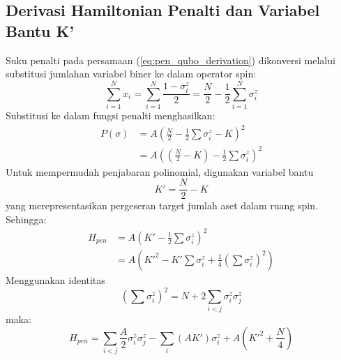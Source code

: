 \subsection{Derivasi Hamiltonian Penalti dan Variabel Bantu K'}
Suku penalti pada persamaan (\ref{eq:pen_qubo_derivation}) dikonversi melalui substitusi jumlahan variabel biner ke dalam operator spin:
\begin{equation}
\sum_{i=1}^N x_i = \sum_{i=1}^N \frac{1-\sigma_i^z}{2} = \frac{N}{2} - \frac{1}{2}\sum_{i=1}^N \sigma_i^z
\end{equation}
Substitusi ke dalam fungsi penalti menghasilkan:
\begin{equation}
\begin{aligned}
P(\sigma) &= A\left( \frac{N}{2} - \frac{1}{2}\sum \sigma_i^z - K \right)^2 \\
&= A\left( \left(\frac{N}{2} - K\right) - \frac{1}{2}\sum \sigma_i^z \right)^2
\end{aligned}
\end{equation}
Untuk mempermudah penjabaran polinomial, digunakan variabel bantu 
\begin{equation}
K' = \frac{N}{2} - K
\end{equation}
yang merepresentasikan pergeseran target jumlah aset dalam ruang spin. Sehingga:
\begin{equation}
\begin{aligned}
H_{pen} &= A \left( K' - \frac{1}{2} \sum \sigma_i^z \right)^2 \\
&= A \left( K'^2 - K' \sum \sigma_i^z + \frac{1}{4} \left(\sum \sigma_i^z\right)^2 \right)
\end{aligned}
\end{equation}
Menggunakan identitas 
\begin{equation}
\left(\sum \sigma_i^z\right)^2 = N + 2 \sum_{i<j} \sigma_i^z \sigma_j^z
\end{equation}
maka:
\begin{equation}
H_{pen} = \sum_{i<j} \frac{A}{2} \sigma_i^z \sigma_j^z - \sum_i (A K') \sigma_i^z + A\left(K'^2 + \frac{N}{4}\right)
\label{eq:h_pen_final_appendix}
\end{equation}

